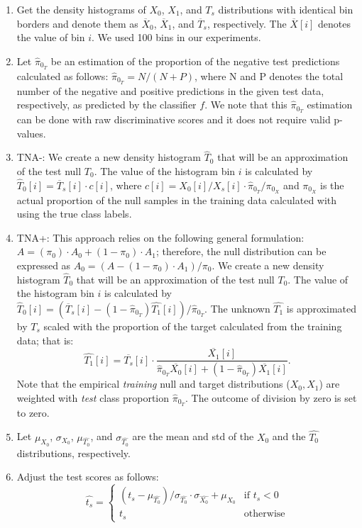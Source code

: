 \documentclass[10pt,letterpaper]{article}
\newcommand{\edit}[1]{#1} %
\begin{document}
\begin{enumerate}%
	\itemsep-3pt  		
	\item [1.] Get the density histograms of $X_0$, $X_1$, and $T_s$ distributions with identical bin borders and denote them as $\overline{X}_0$, $\overline{X}_1$, and $\overline{T}_s$, respectively.
	The $\overline{X}[i]$ denotes the value of bin $i$.
	We used 100 bins in our experiments.
	
	\item [2.] Let $\hat{\pi}_{0_T}$ be an estimation of the proportion of the negative test predictions calculated as follows:  $\hat{\pi}_{0_T} = N/(N+P)$, where N and P denotes the total number of the negative and positive predictions in the given test data, respectively, as predicted by the classifier $f$.
	We note that this $\hat{\pi}_{0_T}$ estimation can be done with raw discriminative scores and it does not require valid p-values.
	
	\item [3a.] TNA-:  We create a new density histogram $\hat{T}_0$ that will be an approximation of the test null $T_0$.
	The value of the histogram bin $i$ is calculated  by $\hat{T}_0[i] = \overline{T}_s[i]\cdot c[i]$, where  $c[i]=X_0[i]/X_s[i]\cdot \edit{\hat{\pi}_{0_T}/\pi_{0_X}}$ and $\pi_{0_X}$ is the actual proportion of the null samples in the training data calculated with using the true class labels.
	
	\item [3b.] TNA+: This approach relies on the following general formulation: $A = (\pi_0) \cdot A_0 + (1-\pi_0) \cdot A_1$; therefore, the null distribution can be expressed as $A_0 = (A - (1-\pi_0) \cdot A_1)/\pi_0$.
	We create a new density histogram $\hat{T}_0$ that will be an approximation of the test null $T_0$.
	The value of the histogram bin $i$ is calculated  by $\hat{T}_0[i] = (\overline{T}_s[i] -  (1-\hat{\pi}_{0_T})\hat{T_1}[i])/\hat{\pi}_{0_T}$.
	The unknown $\hat{T_1}$ is approximated by $T_s$ scaled with the proportion of the target calculated from the training data; that is:  $$\hat{T_1}[i] = \overline{T_s}[i]\cdot \frac {\overline{X_1}[i]}{\hat{\pi}_{0_T} \overline{X_0}[i] + (1-\hat{\pi}_{0_T}) \overline{X_1}[i]}.$$ Note that the empirical {\em training} null and target distributions ($X_0, X_1$) are weighted with {\em test} class proportion  $\hat{\pi}_{0_T}$.
	The outcome of division by zero is set to zero.
		
	\item [4.] Let $\mu_{X_0}$, $\sigma_{X_0}$, $\mu_{\hat{T_0}}$, and $\sigma_{\hat{T_0}}$ are the mean and std of the $X_0$ and the $\hat{T_0}$ distributions, respectively. 
	
	\item [5.] Adjust the test scores \edit{as follows:
	$$\hat{t_s} = \begin{cases} (t_s-\mu_{\hat{T_0}})/\sigma_{\hat{T_0}} \cdot \sigma_{\hat{X_0}} + \mu_{X_0} & \text{if } t_s < 0 \\ t_s & \text{otherwise} \end{cases}$$}
\end{enumerate}
\end{document}
